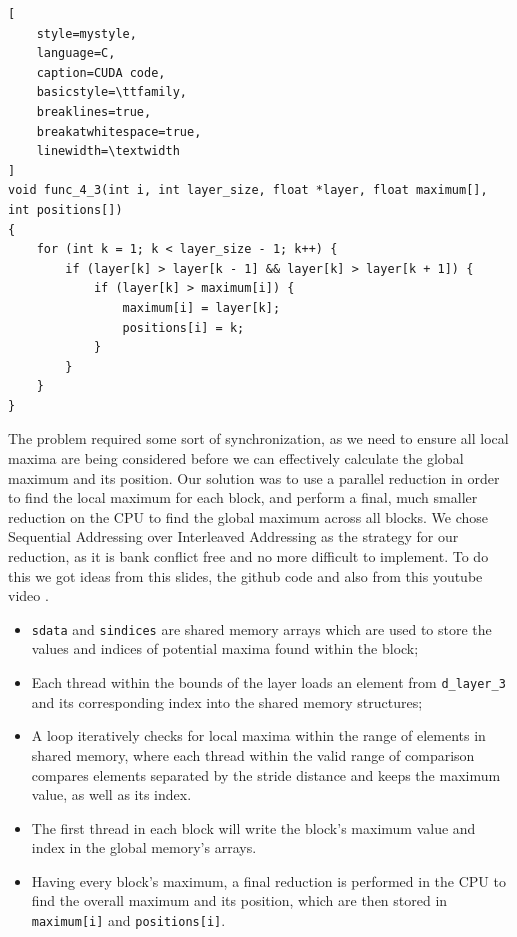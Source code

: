 \documentclass[10pt,journal,compsoc]{IEEEtran}
\begin{document}
\begin{minipage}{\linewidth}
\begin{lstlisting}[
    style=mystyle,
    language=C,
    caption=CUDA code,
    basicstyle=\ttfamily,
    breaklines=true,
    breakatwhitespace=true,
    linewidth=\textwidth
]
void func_4_3(int i, int layer_size, float *layer, float maximum[], int positions[])
{
    for (int k = 1; k < layer_size - 1; k++) {
        if (layer[k] > layer[k - 1] && layer[k] > layer[k + 1]) {
            if (layer[k] > maximum[i]) {
                maximum[i] = layer[k];
                positions[i] = k;
            }
        }
    }
}
\end{lstlisting}
\end{minipage}
\par The problem required some sort of synchronization, as we need to ensure all local maxima are being considered before we can effectively calculate the global maximum and its position. Our solution was to use a parallel reduction in order to find the local maximum for each block, and perform a final, much smaller reduction on the CPU to find the global maximum across all blocks.
We chose Sequential Addressing over Interleaved Addressing as the strategy for our reduction, as it is bank conflict free and no more difficult to implement. To do this we got ideas from this \cite{CudaSlides} slides, the \cite{Reduction} github code and also from this youtube video \cite{ReductionVideo}.

\begin{itemize}
  \item \texttt{sdata} and \texttt{sindices} are shared memory arrays which are used to store the values and indices of potential maxima found within the block;
  \item Each thread within the bounds of the layer loads an element from \texttt{d\-\_layer\-\_3} and its corresponding index into the shared memory structures;
  \item A loop iteratively checks for local maxima within the range of elements in shared memory, where each thread within the valid range of comparison compares elements separated by the stride distance and keeps the maximum value, as well as its index.
  \item The first thread in each block will write the block's maximum value and index in the global memory's arrays.
  \item Having every block's maximum, a final reduction is performed in the CPU to find the overall maximum and its position, which are then stored in \texttt{maximum[i]} and \texttt{positions[i]}.
\end{itemize}
\end{document}
